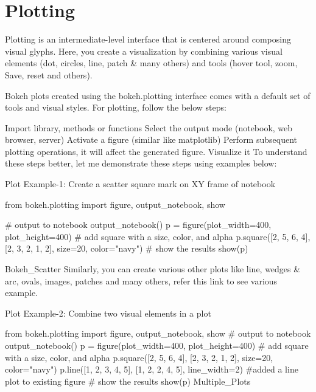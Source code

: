 
\section{Plotting}

Plotting is an intermediate-level interface that is centered around composing visual glyphs. 
Here, you create a visualization by combining various visual elements (dot, circles, line, patch & many others) 
and tools (hover tool, zoom, Save, reset and others).

Bokeh plots created using the bokeh.plotting interface comes with a default set of tools and visual styles. 
For plotting, follow the below steps:

Import library, methods or functions
Select the output mode (notebook, web browser, server)
Activate a figure (similar like matplotlib)
Perform subsequent plotting operations, it will affect the generated figure.
Visualize it
To understand these steps better, let me demonstrate these steps using examples below:


 

Plot Example-1: Create a scatter square mark on XY frame of notebook

from bokeh.plotting import figure, output_notebook, show

# output to notebook
output_notebook()
p = figure(plot_width=400, plot_height=400)
# add square with a size, color, and alpha
p.square([2, 5, 6, 4], [2, 3, 2, 1, 2], size=20, color="navy")
# show the results
show(p)



Bokeh_Scatter
Similarly, you can create various other plots like line, wedges & arc, ovals, images, patches and many others, refer this link to see various example.


 

Plot Example-2: Combine two visual elements in a plot

from bokeh.plotting import figure, output_notebook, show
# output to notebook
output_notebook()
p = figure(plot_width=400, plot_height=400)
# add square with a size, color, and alpha
p.square([2, 5, 6, 4], [2, 3, 2, 1, 2], size=20, color="navy")
p.line([1, 2, 3, 4, 5], [1, 2, 2, 4, 5], line_width=2) #added a line plot to existing figure
# show the results
show(p)
Multiple_Plots


